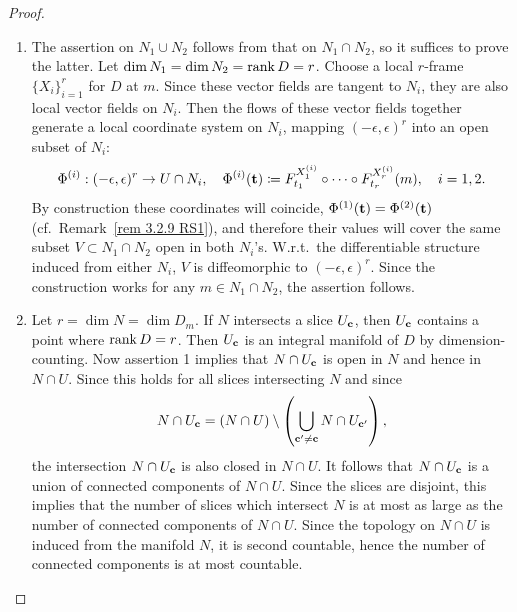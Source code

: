 \begin{proof}
\begin{enumerate}
    \item The assertion on $N_1\cup N_2$ follows from that on $N_1\cap N_2$, so it suffices to prove the latter. Let $\dim N_1=\dim N_2=\rank D=r$. Choose a local $r$-frame $\{X_i\}_{i=1}^r$ for $D$ at $m$. Since these vector fields are tangent to $N_i$, they are also local vector fields on $N_i$. Then the flows of these vector fields together generate a local coordinate system on $N_i$, mapping $(-\epsilon,\epsilon)^r$ into an open subset of $N_i$:
    \[\Phi^{(i)}:(-\epsilon,\epsilon)^r\to U\cap N_i,\quad \Phi^{(i)}(\bf{t})\coloneqq F^{X^{(i)}_1}_{t_1}\circ \cdots\circ F^{X^{(i)}_r}_{t_r}(m),\quad i=1,2.\]
    By construction these coordinates will coincide, $\Phi^{(1)}(\bf{t})=\Phi^{(2)}(\bf{t})$ (cf.\ Remark~\ref{rem 3.2.9 RS1}), and therefore their values will cover the same subset $V\subset N_1\cap N_2$ open in both $N_i$'s. W.r.t.~the differentiable structure induced from either $N_i$, $V$ is diffeomorphic to $(-\epsilon,\epsilon)^r$. Since the construction works for any $m\in N_1\cap N_2$, the assertion follows. 

    \item Let $r=\dim N=\dim D_m$. If $N$ intersects a slice $U_{\bf{c}}$, then $U_{\bf{c}}$ contains a point where $\rank D=r$. Then $U_{\bf{c}}$ is an integral manifold of $D$ by dimension-counting. Now assertion 1 implies that $N\cap U_{\bf{c}}$ is open in $N$ and hence in $N\cap U$. Since this holds for all slices intersecting $N$ and since
    \[N\cap U_{\bf{c}}=(N\cap U)\setminus\left(\bigcup_{\bf{c}'\neq \bf{c}}N\cap U_{\bf{c}'}\right),\]
    the intersection $N\cap U_{\bf{c}}$ is also closed in $N\cap U$. It follows that $N\cap U_{\bf{c}}$ is a union of connected components of $N\cap U$. Since the slices are disjoint, this implies that the number of slices which intersect $N$ is at most as large as the number of connected components of $N\cap U$. Since the topology on $N\cap U$ is induced from the manifold $N$, it is second countable, hence the number of connected components is at most countable.
\end{enumerate}
\end{proof}



